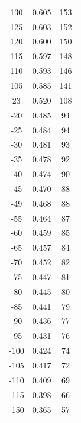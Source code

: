 \begin{table}[p]
\begin{tabular}{SSS}
		130 & 0.605 & 153  \\
		125 & 0.603 & 152  \\
		120 & 0.600 & 150  \\
		115 & 0.597 & 148  \\
		110 & 0.593 & 146  \\
		105 & 0.585 & 141  \\
		23 & 0.520 & 108  \\
		-20 & 0.485 & 94 \\
		-25 & 0.484 & 94  \\
		-30 & 0.481 & 93  \\
		-35 & 0.478 & 92  \\
		-40 & 0.474 & 90  \\
		-45 & 0.470 & 88  \\
		-49 & 0.468 & 88  \\
		-55 & 0.464 & 87  \\
		-60 & 0.459 & 85  \\
		-65 & 0.457 & 84  \\
		-70 & 0.452 & 82  \\
		-75 & 0.447 & 81  \\
		-80 & 0.445 & 80  \\
		-85 & 0.441 & 79  \\
		-90 & 0.436 & 77  \\
		-95 & 0.431 & 76  \\
		-100 & 0.424 & 74  \\
		-105 & 0.417 & 72  \\
		-110 & 0.409 & 69  \\
		-115 & 0.398 & 66  \\
		-150 & 0.365 & 57  \\
		\bottomrule
	\end{tabular}
\end{table}  
